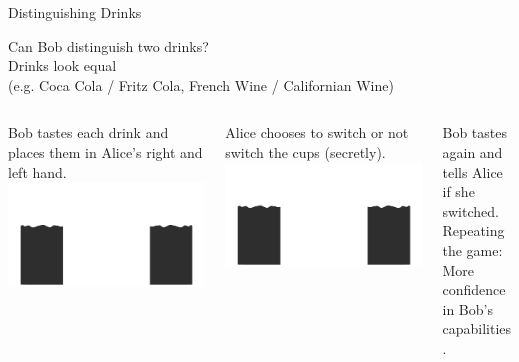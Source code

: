 \documentclass[presentation]{beamer}
\begin{document}
\begin{frame}[label=sec-5-3]{Distinguishing Drinks}
\begin{center}
Can Bob distinguish two drinks? \\
\footnotesize Drinks look equal \\
(e.g. Coca Cola / Fritz Cola, French Wine / Californian Wine)
\end{center}

\begin{columns}[t]

\begin{column}{0.3\textwidth}
\footnotesize 
Bob tastes each drink and places them in Alice's right and left hand.\\[1cm]

\includegraphics[width=\textwidth]{images/zkp/step1.pdf}


\pause
\end{column}

\begin{column}{0.3\textwidth}
\footnotesize
Alice chooses to switch or not switch the cups (secretly).\\[1.3cm]

\includegraphics[width=\textwidth]{images/zkp/step2.pdf}

\pause
\end{column}

\begin{column}{0.3\textwidth}
\footnotesize
Bob tastes again and tells Alice if she switched.\\[1cm]

\normalsize
Repeating the game: More confidence in Bob's capabilities.
\end{column}
\end{columns}
\end{frame}
\end{document}
